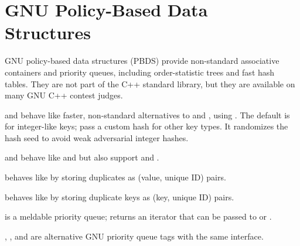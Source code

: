 \section{\texorpdfstring{GNU Policy-Based Data Structures}{8.6 GNU Policy-Based Data Structures}}
\setcounter{section}{6}
\label{sec:8.6}
GNU policy-based data structures (PBDS) provide non-standard associative containers and priority queues, including order-statistic trees and fast hash tables. They are not part of the C++ standard library, but they are available on many GNU C++ contest judges.

\begin{compactitem}
  \item {} and  behave like faster, non-standard alternatives to  and , using . The default  is for integer-like keys; pass a custom hash for other key types. It randomizes the hash seed to avoid weak adversarial integer hashes.
  \item {} and  behave like  and  but also support  and .
  \item {} behaves like  by storing duplicates as (value, unique ID) pairs.
  \item {} behaves like  by storing duplicate keys as (key, unique ID) pairs.
  \item {} is a meldable priority queue;  returns an iterator that can be passed to  or .
  \item {}, , and  are alternative GNU priority queue tags with the same interface.
\end{compactitem}

